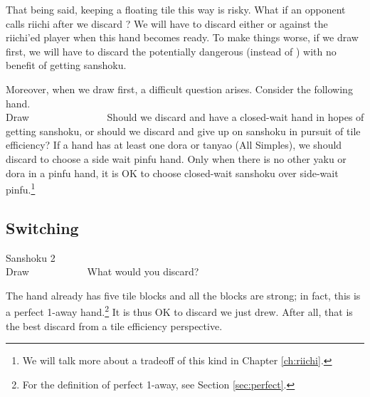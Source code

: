 \bigskip
That being said, keeping a floating tile this way is risky. What if an opponent calls riichi after we discard {\LARGE\bei}? We will have to discard either {\LARGE{}} or {\LARGE{}} against the riichi'ed player when this hand becomes ready. To make things worse, if we draw {\LARGE{}} first, we will have to discard the potentially dangerous {\LARGE{}} (instead of {\LARGE\bei}) with no benefit of getting {\jap sanshoku}.

\bigskip
Moreover, when we draw {\LARGE{}} first, a difficult question arises. Consider the following hand.
\bp
{}~\\
\hfill\footnotesize{Draw~~~~~~~~~~~~~~~}
\ep
Should we discard {\LARGE{}} and have a closed-wait hand in hopes of getting {\jap sanshoku}, or should we discard {\LARGE{}} and give up on {\jap sanshoku} in pursuit of tile efficiency?
If a hand has at least one {\jap dora} or {\jap tanyao} (All Simples), we should discard {\LARGE{}} to choose a side wait {\jap pinfu} hand. Only when there is no other {\jap yaku} or {\jap dora} in a {\jap pinfu} hand, it is OK to choose closed-wait {\jap sanshoku} over side-wait {\jap pinfu}.\footnote{We will talk more about a tradeoff of this kind in Chapter \ref{ch:riichi}.}



\newpage
\subsection{Switching} \label{sec:san2}

\begin{itembox}[r]{{\jap Sanshoku} 2}
\bp
{}~\\
\hfill\footnotesize{Draw~~~~~~~~~~~}
\ep
\vspace{-17pt}What would you discard? \vspace{-5pt}
\end{itembox}
\noindent
The hand already has five tile blocks and all the blocks are strong; in fact, this is a perfect 1-away hand.\footnote{For the definition of perfect 1-away, see Section \ref{sec:perfect}.} It is thus OK to discard {\LARGE{}} we just drew. After all, that is the best discard from a tile efficiency perspective.

